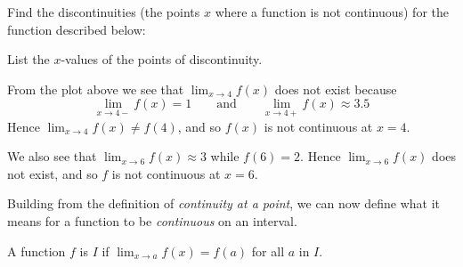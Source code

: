 \documentclass{ximera}
\begin{document}
\begin{example}
Find the discontinuities (the points $x$ where a function is not
continuous) for the function described below:
\begin{image}
\end{image}

List the $x$-values of the points of discontinuity.



\begin{explanation}
From the plot above we see that $\lim_{x\to 4} f(x)$ does not exist
because
\[
\lim_{x\to 4-}f(x) = 1\qquad\text{and}\qquad \lim_{x\to 4+}f(x) \approx 3.5
\]
Hence $\lim_{x\to 4} f(x) \ne f(4)$, and so $f(x)$ is not
continuous at $x=4$.

We also see that $\lim_{x\to 6} f(x) \approx 3$ while $f(6) =
2$. Hence $\lim_{x\to 6} f(x)$ does not exist, and so $f$ is not
continuous at $x=6$.
\end{explanation}
\end{example}


Building from the definition of \textit{continuity at a point}, we can
now define what it means for a function to be \textit{continuous} on
an interval.

\begin{definition}
  A function $f$ is  $I$ if
  $\lim_{x\to a} f(x) = f(a)$ for all $a$ in $I$.
\end{definition}
\end{document}
